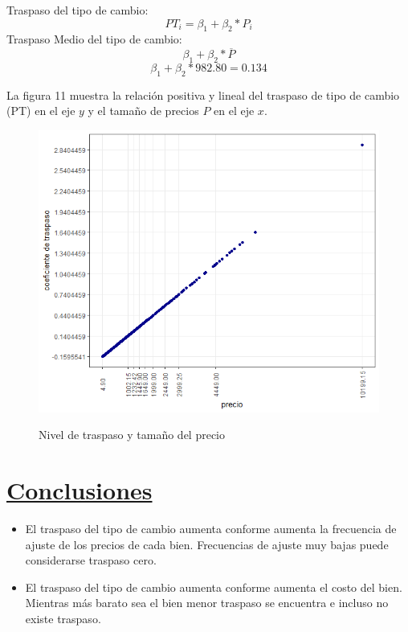 \documentclass[12pt,a4paper,pdflatex]{article}
\begin{document}
Traspaso del tipo de cambio:\\
\begin{equation}
PT_{i}= \beta_{1} + \beta_{2}*P_{i}
\end{equation}
Traspaso Medio del tipo de cambio:\\
\begin{equation}
\beta_{1} + \beta_{2}*\overline P
\end{equation}
\begin{equation}
\beta_{1} + \beta_{2}*982.80 = 0.134
\end{equation}

La figura 11 muestra la relación positiva y lineal del traspaso de tipo de cambio (PT) en el eje $y$ y el tamaño de precios $P$ en el eje $x$.
\begin{figure}[!ht]
\centering
 \caption{Nivel de traspaso y tamaño del precio}
\includegraphics[scale=0.6]{E2.png}
  \label{fig:Nivel de traspaso y tamaño del precio}
\end{figure}
\clearpage
\section{\underline{Conclusiones}}\label{sec5}
\begin{itemize}
	\item El traspaso del tipo de cambio aumenta conforme aumenta la frecuencia de ajuste de los precios de cada bien. Frecuencias de ajuste muy bajas puede considerarse traspaso cero.\\
	\item El traspaso del tipo de cambio aumenta conforme aumenta el costo del bien. Mientras más barato sea el bien menor traspaso se encuentra e incluso no existe traspaso. \\
\end{itemize}
\clearpage
\newpage
\end{document}
